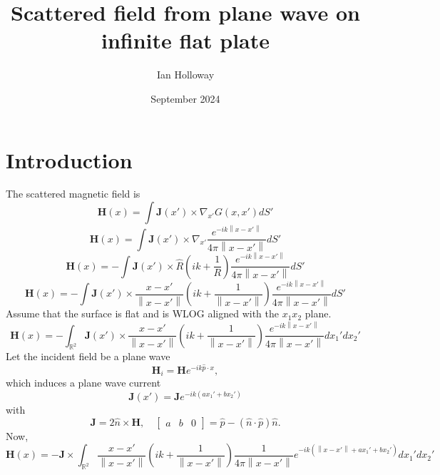 \documentclass{article}
\title{Scattered field from plane wave on infinite flat plate}
\author{Ian Holloway}
\date{September 2024}
\newcommand{\norm}[1]{\left\lVert #1 \right\rVert}
\theoremstyle{plain}
\begin{document}
\maketitle

\section{Introduction}\label{sec_intro}

The scattered magnetic field is
\begin{equation}
	\mathbf{H}(x) = \int \mathbf{J}(x') \times \nabla_{x'} G(x,x') dS'
\end{equation}
\begin{equation}
	\mathbf{H}(x)
	= \int \mathbf{J}(x') \times \nabla_{x'} \frac{e^{-ik\norm{x-x'}}}{4\pi\norm{x-x'}} dS'
\end{equation}
\begin{equation}
	\mathbf{H}(x)
	= -\int \mathbf{J}(x') \times \hat{R} \left( ik + \frac{1}{R} \right) \frac{e^{-ik\norm{x-x'}}}{4\pi\norm{x-x'}} dS'
\end{equation}
\begin{equation}
	\mathbf{H}(x)
	= -\int \mathbf{J}(x') \times \frac{x-x'}{\norm{x-x'}}
	\left( ik + \frac{1}{\norm{x-x'}} \right)
	\frac{e^{-ik\norm{x-x'}}}{4\pi\norm{x-x'}} dS'
\end{equation}
Assume that the surface is flat and is WLOG aligned with the $x_1x_2$ plane.
\begin{equation}
	\mathbf{H}(x)
	= -\int_{\mathbb{R}^2} \mathbf{J}(x') \times \frac{x-x'}{\norm{x-x'}}
	\left( ik + \frac{1}{\norm{x-x'}} \right)
	\frac{e^{-ik\norm{x-x'}}}{4\pi\norm{x-x'}} dx_1'dx_2'
\end{equation}
Let the incident field be a plane wave
\begin{equation}
	\mathbf{H}_i = \mathbf{H}e^{-ik \hat{p} \cdot x},
\end{equation}
which induces a plane wave current
\begin{equation}
	\mathbf{J}(x') = \mathbf{J}e^{-ik(ax_1' + bx_2')}
\end{equation}
with
\begin{equation}
	\mathbf{J} = 2\hat{n}\times\mathbf{H},
	\quad \begin{bmatrix} a & b & 0 \end{bmatrix} = \hat{p} - \left( \hat{n}\cdot\hat{p} \right)\hat{n}.
\end{equation}
Now,
\begin{equation}
	\mathbf{H}(x)
	= -\mathbf{J} \times \int_{\mathbb{R}^2}
	\frac{x-x'}{\norm{x-x'}}
	\left( ik + \frac{1}{\norm{x-x'}} \right)
	\frac{1}{4\pi\norm{x-x'}}
	e^{-ik\left( \norm{x-x'} + ax_1' + bx_2' \right)} dx_1'dx_2'
\end{equation}
\end{document}
